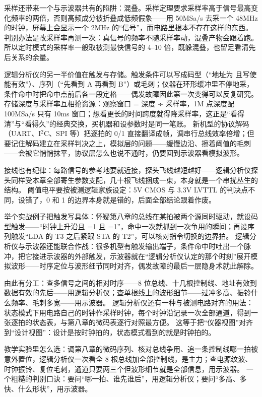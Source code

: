 采样还带来一个与示波器共有的陷阱：混叠。采样定理要求采样率高于信号最高变化频率的两倍，否则高频成分被折叠成低频假象——用 50MSa/s 去采一个 48MHz 的时钟，屏幕上会显示一个 2MHz 的“信号”，而电路里根本不存在这样的东西。
判别办法是改采样率再测一次：真信号的频率不随采样率动，混叠产物会跟着跑。
所以定时模式的采样率一般取被测最快信号的 4--10 倍，既躲混叠，也留足看清先后关系的余量。

逻辑分析仪的另一半价值在触发与存储。触发条件可以写成码型（“地址为  且写使能有效”）、序列（“先看到 A 再看到 B”）或毛刺；仪器在环形缓冲里不停地采，条件命中时把命中点前后各一段定格——偶发故障因此第一次变得可以反复研究。
存储深度与采样率互相抢资源：观察窗口 = 深度 ÷ 采样率，1M 点深度配 100MSa/s 只有 10ms 窗口；想看更长的时间跨度就得降采样率，这正是“看得清”与“看得久”的经典交换，买机器和设参数时是同一笔账。
新机型的协议解码（UART、I$^2$C、SPI 等）把逐拍的 0/1 直接翻译成帧，调串行总线效率倍增；但要记住解码建立在采样判决之上，模拟层的问题——缓慢边沿、擦着阈值的毛刺——会被它悄悄抹平，协议层怎么也说不通时，仍要回到示波器看模拟波形。

接线也有纪律：每路信号的参考地要就近接，探头飞线越短越好——逻辑分析仪探头同样受本章全部寄生参数支配，几十根飞线捆成一束，本身就是一个串扰丛生的结构。
阈值电平要按被测逻辑家族设定：5V CMOS 与 3.3V LVTTL 的判决点不同，设错了，0 和 1 的边界本身就是错的，后面全部结论跟着作废。

举个实战例子把触发写具体：怀疑第八章的总线在某拍被两个源同时驱动，就设码型触发——“时钟上升沿且 =1 且 =1”，命中一次就抓到一次争用的瞬间；再设序列触发“LDA 的 T3 之后紧跟 STA 的 T2”，可以核对指令切换的边界拍。
逻辑分析仪与示波器还能联合作战：很多机型有触发输出端子，条件命中时吐出一个脉冲，把它接进示波器的外部触发，示波器就在“逻辑分析仪认定的那个时刻”展开模拟波形——时序定位与波形细节同时对齐，偶发故障的最后一层隐身术就此解除。

由此有分工：查多信号之间的相对时序——8 位总线、十几根控制线、地址有效到数据有效的先后——用逻辑分析仪；查单根线上的波形细节——过冲多高、振铃什么频率、毛刺多宽——用示波器。
逻辑分析仪还有一种与被测电路对齐的用法：状态模式下用电路自己的时钟作采样时钟，每个时钟沿记录一次全部通道，得到一张逐拍的状态表，与第八章的微码表逐行对照最方便。
这等于把“仪器视图”对齐到“设计视图”：设计是按时钟拍的，状态模式看到的就是时钟拍的。

教学实验里怎么选：调第八章的微码序列、核对总线争用、追一条控制线哪一拍被意外置位，逻辑分析仪一次看全 8 根总线加全部控制线，是主力；查电源纹波、时钟振铃、复位毛刺，通道只要两三个但波形细节就是全部信息，用示波器。
一个粗糙的判别口诀：要问“哪一拍、谁先谁后”，用逻辑分析仪；要问“多高、多快、什么形状”，用示波器。

